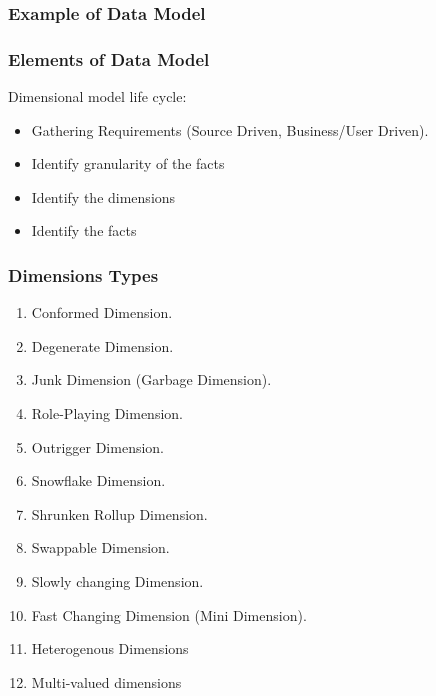 \begin{frame}
    \frametitle{Example of Data Model}
    
\end{frame}

\begin{frame}
	\frametitle{Elements of Data Model}
		Dimensional model life cycle:
	    \begin{itemize}[<+->]
			\item Gathering Requirements (Source Driven, Business/User Driven).
			\item Identify granularity of the facts
			\item Identify the dimensions
			\item Identify the facts
	    \end{itemize}	
\end{frame}

\begin{frame}
\frametitle{Dimensions Types}
	\begin{enumerate}[<+->]
		\item Conformed Dimension.
		\item Degenerate Dimension.
		\item Junk Dimension (Garbage Dimension).
		\item Role-Playing Dimension.
		\item Outrigger Dimension.
		\item Snowflake Dimension.
		\item Shrunken Rollup Dimension.
		\item Swappable Dimension.
		\item Slowly changing Dimension.
		\item Fast Changing Dimension (Mini Dimension).
		\item Heterogenous Dimensions
		\item Multi-valued dimensions
	\end{enumerate}
\end{frame}




